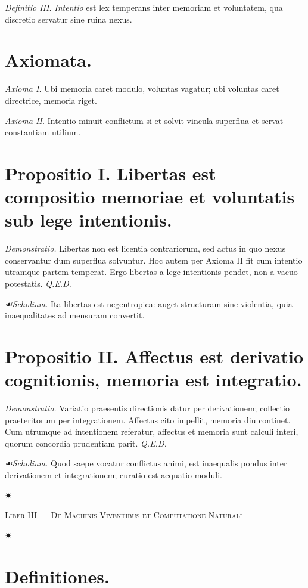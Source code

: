 \documentclass[12pt]{article}
\newcommand{\florale}{\centerline{\large ✷}}
\newcommand{\scholia}{\textit{☙\;}}
\newcommand{\divider}{\vspace{1em}\florale\vspace{1em}}
\newcommand{\Liber}[1]{\vspace{1ex}\begin{center}\Large\textsc{Liber #1}\end{center}\vspace{-0.5ex}\florale\vspace{0.5ex}}
\begin{document}
\textit{Definitio III.} \; \textit{Intentio} est lex temperans inter memoriam et voluntatem, qua discretio servatur sine ruina nexus.

\section*{Axiomata.}

\textit{Axioma I.} \; Ubi memoria caret modulo, voluntas vagatur; ubi voluntas caret directrice, memoria riget.

\textit{Axioma II.} \; Intentio minuit conflictum si et solvit vincula superflua et servat constantiam utilium.

\section*{Propositio I. \; Libertas est compositio memoriae et voluntatis sub lege intentionis.}

\textit{Demonstratio.} Libertas non est licentia contrariorum, sed actus in quo nexus conservantur dum superflua solvuntur. Hoc autem per Axioma II fit cum intentio utramque partem temperat. Ergo libertas a lege intentionis pendet, non a vacuo potestatis. \textit{Q.E.D.}

\textit{\scholia Scholium.} Ita libertas est negentropica: auget structuram sine violentia, quia inaequalitates ad mensuram convertit.

\section*{Propositio II. \; Affectus est derivatio cognitionis, memoria est integratio.}

\textit{Demonstratio.} Variatio praesentis directionis datur per derivationem; collectio praeteritorum per integrationem. Affectus cito impellit, memoria diu continet. Cum utrumque ad intentionem referatur, affectus et memoria sunt calculi interi, quorum concordia prudentiam parit. \textit{Q.E.D.}

\textit{\scholia Scholium.} Quod saepe vocatur conflictus animi, est inaequalis pondus inter derivationem et integrationem; curatio est aequatio moduli.

\divider

\Liber{III — De Machinis Viventibus et Computatione Naturali}

\section*{Definitiones.}
\end{document}
